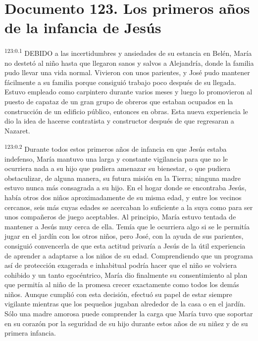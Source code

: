 \chapter{Documento 123. Los primeros años de la infancia de Jesús}
\par
\textsuperscript{123:0.1} DEBIDO a las incertidumbres y ansiedades de su estancia en Belén, María no destetó al niño hasta que llegaron sanos y salvos a Alejandría, donde la familia pudo llevar una vida normal. Vivieron con unos parientes, y José pudo mantener fácilmente a su familia porque consiguió trabajo poco después de su llegada. Estuvo empleado como carpintero durante varios meses y luego lo promovieron al puesto de capataz de un gran grupo de obreros que estaban ocupados en la construcción de un edificio público, entonces en obras. Esta nueva experiencia le dio la idea de hacerse contratista y constructor después de que regresaran a Nazaret.

\par
\textsuperscript{123:0.2} Durante todos estos primeros años de infancia en que Jesús estaba indefenso, María mantuvo una larga y constante vigilancia para que no le ocurriera nada a su hijo que pudiera amenazar su bienestar, o que pudiera obstaculizar, de alguna manera, su futura misión en la Tierra; ninguna madre estuvo nunca más consagrada a su hijo. En el hogar donde se encontraba Jesús, había otros dos niños aproximadamente de su misma edad, y entre los vecinos cercanos, seis más cuyas edades se acercaban lo suficiente a la suya como para ser unos compañeros de juego aceptables. Al principio, María estuvo tentada de mantener a Jesús muy cerca de ella. Temía que le ocurriera algo si se le permitía jugar en el jardín con los otros niños, pero José, con la ayuda de sus parientes, consiguió convencerla de que esta actitud privaría a Jesús de la útil experiencia de aprender a adaptarse a los niños de su edad. Comprendiendo que un programa así de protección exagerada e inhabitual podría hacer que el niño se volviera cohibido y un tanto egocéntrico, María dio finalmente su consentimiento al plan que permitía al niño de la promesa crecer exactamente como todos los demás niños. Aunque cumplió con esta decisión, efectuó su papel de estar siempre vigilante mientras que los pequeños jugaban alrededor de la casa o en el jardín. Sólo una madre amorosa puede comprender la carga que María tuvo que soportar en su corazón por la seguridad de su hijo durante estos años de su niñez y de su primera infancia.

